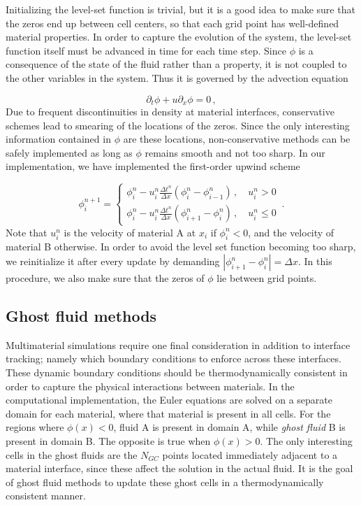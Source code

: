 \documentclass[final,3p,twocolumn,times]{elsarticle}
\begin{document}
Initializing the level-set function is trivial, but it is a good idea to make
sure that the zeros end up between cell centers, so that each grid point has
well-defined material properties. In order to capture the evolution of the
system, the level-set function itself must be advanced in time for each time
step. Since $\phi$ is a consequence of the state of the fluid rather than a
property, it is not coupled to the other variables in the system.  Thus it is
governed by the advection equation 

\begin{equation}
    \label{eq:phi}
    \partial_t \phi + u\partial_x \phi = 0 \,,
\end{equation}
%
Due to frequent discontinuities in density at material interfaces, conservative
schemes lead to smearing of the locations of the zeros. Since the only
interesting information contained in $\phi$ are these locations,
non-conservative methods can be safely implemented as long as $\phi$ remains
smooth and not too sharp. In our implementation, we have implemented the
first-order upwind scheme 

\begin{equation}
    \label{eq:advanceLevelSet}
    \phi_i^{n+1} = \begin{cases}
        \phi_i^n-u_i^n \frac{\Delta t^n}{\Delta x}(\phi_i^n-\phi_{i-1}^n)
        \,,\quad u_i^n > 0 \\
        \phi_i^n-u_i^n \frac{\Delta t^n}{\Delta x}(\phi_{i+1}^n-\phi_i^n) 
        \,,\quad u_i^n \leq 0
    \end{cases} \,.
\end{equation}
%
Note that $u_i^n$ is the velocity of material A at $x_i$ if $\phi_i^n < 0$, and
the velocity of material B otherwise.  In order to avoid the level set function
becoming too sharp, we reinitialize it after every update by demanding
$|\phi_{i+1}^n-\phi_i^n|=\Delta x$. In this procedure, we also make sure that
the zeros of $\phi$ lie between grid points. 

\subsection{Ghost fluid methods}
\label{subsec:ghostfluid}

Multimaterial simulations require one final consideration in addition to
interface tracking; namely which boundary conditions to enforce across these
interfaces. These dynamic boundary conditions should be thermodynamically
consistent in order to capture the physical interactions between materials. In
the computational implementation, the Euler equations are solved on a separate
domain for each material, where that material is present in all cells. For the
regions where $\phi(x) < 0$, fluid A is present in domain A, while \emph{ghost
fluid} B is present in domain B. The opposite is true when $\phi(x) > 0$. The
only interesting cells in the ghost fluids are the $N_{GC}$ points located
immediately adjacent to a material interface, since these affect the solution
in the actual fluid. It is the goal of ghost fluid methods to update these
ghost cells in a thermodynamically consistent manner. 
\end{document}
